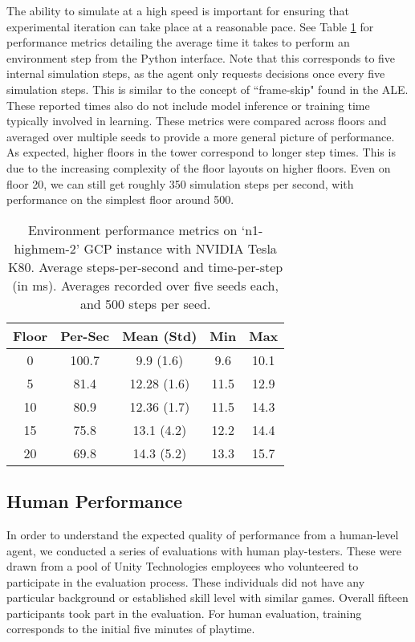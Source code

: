 \documentclass{article}
\begin{document}
The ability to simulate at a high speed is important for ensuring that experimental iteration can take place at a reasonable pace. See Table \ref{table:environmentPerformance} for performance metrics detailing the average time it takes to perform an environment step from the Python interface. Note that this corresponds to five internal simulation steps, as the agent only requests decisions once every five simulation steps. This is similar to the concept of ``frame-skip" found in the ALE. These reported times also do not include model inference or training time typically involved in learning. These metrics were compared across floors and averaged over multiple seeds to provide a more general picture of performance. As expected, higher floors in the tower correspond to longer step times. This is due to the increasing complexity of the floor layouts on higher floors. Even on floor 20, we can still get roughly 350 simulation steps per second, with performance on the simplest floor around 500.

\begin{table}
\begin{center}
 \setlength\tabcolsep{5.5pt}
 \begin{tabular}{||c | c | c c c||} 
 \hline
 Floor & Per-Sec & Mean (Std) & Min & Max \\
 \hline\hline
 0 & 100.7 & 9.9 (1.6) & 9.6 & 10.1 \\ 
 \hline
 5 & 81.4 & 12.28 (1.6) & 11.5 & 12.9 \\ 
 \hline
 10 & 80.9 & 12.36 (1.7) & 11.5 & 14.3 \\ 
 \hline
 15 & 75.8 & 13.1 (4.2) & 12.2 & 14.4 \\ 
 \hline
 20 & 69.8 & 14.3 (5.2) & 13.3 & 15.7 \\ 
 \hline
\end{tabular}
\end{center}
\caption{Environment performance metrics on `n1-highmem-2' GCP instance with NVIDIA Tesla K80. Average steps-per-second and time-per-step (in ms). Averages recorded over five seeds each, and 500 steps per seed.}
\label{table:environmentPerformance}
\end{table}


\subsection{Human Performance}

In order to understand the expected quality of performance from a human-level agent, we conducted a series of evaluations with human play-testers. These were drawn from a pool of Unity Technologies employees who volunteered to participate in the evaluation process. These individuals did not have any particular background or established skill level with similar games. Overall fifteen participants took part in the evaluation. For human evaluation, training corresponds to the initial five minutes of playtime.
\end{document}
